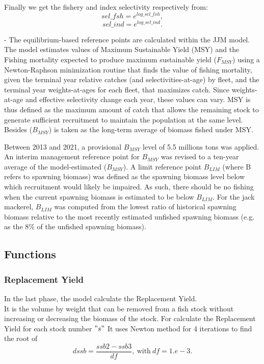 \documentclass{article}
\begin{document}
Finally we get the fishery and index selectivity respectively from:
\begin{equation}
    sel\_fsh=e^{log\_sel\_fsh},
\end{equation}
\begin{equation}
    sel\_ind=e^{log\_sel\_ind}.
\end{equation}

- The equilibrium-based reference points are calculated within the JJM model. The model estimates values of Maximum Sustainable Yield (MSY) and the Fishing mortality expected to produce maximum sustainable yield (\(F_{MSY}\)) using a Newton-Raphson minimization routine that finds the value of fishing mortality, given the terminal year relative catches (and selectivities-at-age) by fleet,  and the terminal year weights-at-ages for each fleet, that maximizes catch. Since weights-at-age and effective selectivity change each year, these values can vary. MSY is thus defined as the maximum amount of catch that allows the remaining stock to generate sufficient recruitment to maintain the population at the same level. Besides (\(B_{MSY}\)) is taken as the long-term average of biomass fished under MSY.

Between 2013 and 2021, a provisional \(B_{MSY}\) level of 5.5 millions tons was applied. 
An interim management reference point for \(B_{MSY}\) was revised to a ten-year average of the model-estimated (\(B_{MSY}\)). 
A limit reference point \(B_{LIM}\) (where B refers to spawning biomass) was defined as the spawning biomass level below which recruitment would likely be impaired. As such, there should be no fishing when the current spawning biomass is estimated to be below \(B_{LIM}\).
For the jack mackerel, \(B_{LIM}\) was computed from the lowest ratio of historical spawning biomass relative to the most recently estimated unfished spawning biomass (e.g. as the 8\% of the unfished spawning biomass).\\






\subsection{Functions}



\subsubsection{Replacement Yield}
In the last phase, the model calculate the Replacement Yield.\\
It is the volume by weight that can be removed from a fish stock without increasing or decreasing the biomass of the stock.
For calculate the Replacement Yield for each stock  number $"s"$ It uses Newton method for 4 iterations to find the root of 
\begin{equation}
    dssb   = \dfrac{ssb2 - ssb3}{df}, \ \text{with} \  df=1.e-3.
\end{equation}
\end{document}
